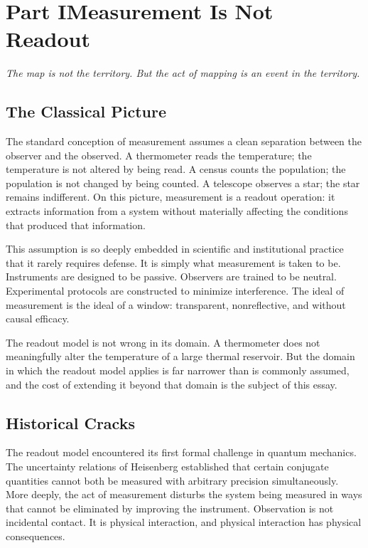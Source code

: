 \documentclass[12pt, a4paper]{article}
\theoremstyle{flyxion}
\newcommand{\flyepigraph}[1]{%
  \begin{center}
    \begin{minipage}{0.72\textwidth}
      \itshape #1
    \end{minipage}
  \end{center}
  \vspace{0.8em}
}
\begin{document}
\bigskip


\section*{Part I\quad Measurement Is Not Readout}

\flyepigraph{The map is not the territory. But the act of mapping is an event in the territory.}

\subsection*{The Classical Picture}

The standard conception of measurement assumes a clean separation between the observer and the observed. A thermometer reads the temperature; the temperature is not altered by being read. A census counts the population; the population is not changed by being counted. A telescope observes a star; the star remains indifferent. On this picture, measurement is a readout operation: it extracts information from a system without materially affecting the conditions that produced that information.

This assumption is so deeply embedded in scientific and institutional practice that it rarely requires defense. It is simply what measurement is taken to be. Instruments are designed to be passive. Observers are trained to be neutral. Experimental protocols are constructed to minimize interference. The ideal of measurement is the ideal of a window: transparent, nonreflective, and without causal efficacy.

The readout model is not wrong in its domain. A thermometer does not meaningfully alter the temperature of a large thermal reservoir. But the domain in which the readout model applies is far narrower than is commonly assumed, and the cost of extending it beyond that domain is the subject of this essay.

\subsection*{Historical Cracks}

The readout model encountered its first formal challenge in quantum mechanics. The uncertainty relations of Heisenberg \cite{heisenberg1927} established that certain conjugate quantities cannot both be measured with arbitrary precision simultaneously. More deeply, the act of measurement disturbs the system being measured in ways that cannot be eliminated by improving the instrument. Observation is not incidental contact. It is physical interaction, and physical interaction has physical consequences.
\end{document}
